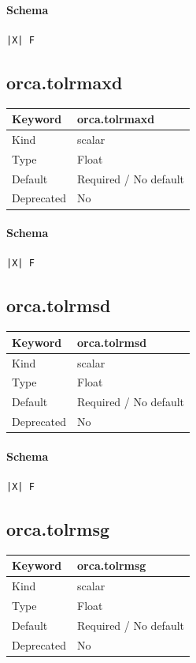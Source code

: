 \documentclass[11pt]{article}
\begin{document}
{{{{{\paragraph{Schema}
\begin{Verbatim}
|X| F
\end{Verbatim}

\subsection{orca.tolrmaxd}
\label{kw:orca-tolrmaxd}
\begin{longtable}{|p{1.5in}|p{4.5in}|}
\hline
Keyword & orca.tolrmaxd \\
\hline
Kind & scalar \\
\hline
Type & Float \\
\hline
Default & Required / No default \\
\hline
Deprecated & No \\
\hline
\end{longtable}
\paragraph{Schema}
\begin{Verbatim}
|X| F
\end{Verbatim}

\subsection{orca.tolrmsd}
\label{kw:orca-tolrmsd}
\begin{longtable}{|p{1.5in}|p{4.5in}|}
\hline
Keyword & orca.tolrmsd \\
\hline
Kind & scalar \\
\hline
Type & Float \\
\hline
Default & Required / No default \\
\hline
Deprecated & No \\
\hline
\end{longtable}
\paragraph{Schema}
\begin{Verbatim}
|X| F
\end{Verbatim}

\subsection{orca.tolrmsg}
\label{kw:orca-tolrmsg}
\begin{longtable}{|p{1.5in}|p{4.5in}|}
\hline
Keyword & orca.tolrmsg \\
\hline
Kind & scalar \\
\hline
Type & Float \\
\hline
Default & Required / No default \\
\hline
Deprecated & No \\
\hline
\end{longtable}
}}}}}
\end{document}
